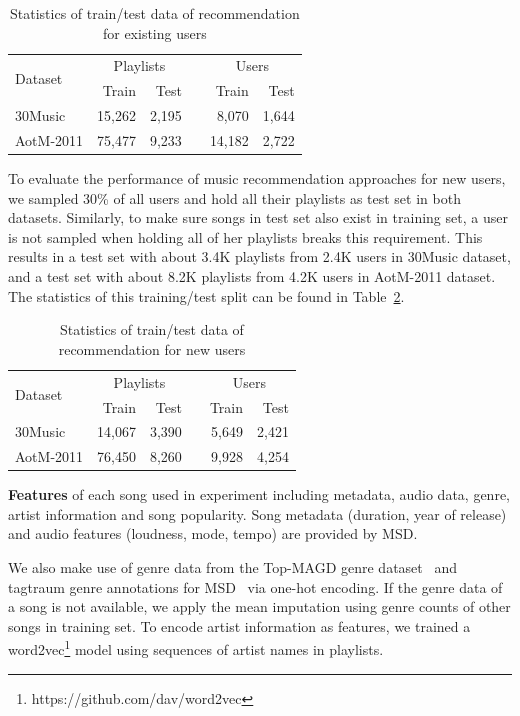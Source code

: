 \begin{table}[!h]
\centering
\caption{Statistics of train/test data of recommendation for existing users}
\label{tab:stats_warm}
\begin{tabular}{lrrcrr}
\toprule
\multirow{2}{*}{Dataset}  & \multicolumn{2}{c}{Playlists} && \multicolumn{2}{c}{Users} \\ \cmidrule{2-3} \cmidrule{5-6}
                          & Train & Test && Train & Test \\
\midrule
30Music   & 15,262 & 2,195 &&  8,070 & 1,644 \\
AotM-2011 & 75,477 & 9,233 && 14,182 & 2,722 \\
\bottomrule
\end{tabular}
\end{table}

To evaluate the performance of music recommendation approaches for new users,
we sampled 30\% of all users and hold all their playlists as test set in both datasets.
Similarly, to make sure songs in test set also exist in training set,
a user is not sampled when holding all of her playlists breaks this requirement.
This results in a test set with about 3.4K playlists from 2.4K users in 30Music dataset,
and a test set with about 8.2K playlists from 4.2K users in AotM-2011 dataset.
The statistics of this training/test split can be found in Table~\ref{tab:stats_cold}.

\begin{table}[!h]
\centering
\caption{Statistics of train/test data of recommendation for new users}
\label{tab:stats_cold}
\begin{tabular}{lrrcrr}
\toprule
\multirow{2}{*}{Dataset}  & \multicolumn{2}{c}{Playlists} && \multicolumn{2}{c}{Users} \\ \cmidrule{2-3} \cmidrule{5-6}
                          & Train & Test && Train & Test \\
\midrule
30Music   & 14,067 & 3,390 && 5,649 & 2,421 \\
AotM-2011 & 76,450 & 8,260 && 9,928 & 4,254 \\
\bottomrule
\end{tabular}
\end{table}


{\bf Features} of each song used in experiment including metadata, audio data, genre, artist information and song popularity.
Song metadata (\eg duration, year of release) and audio features (\eg loudness, mode, tempo) are provided by MSD.

We also make use of genre data from the Top-MAGD genre dataset~\cite{schindler2012facilitating}
and tagtraum genre annotations for MSD~\cite{schreiber2015improving} via one-hot encoding.
If the genre data of a song is not available, we apply the mean imputation using genre counts of other songs in training set.
To encode artist information as features,
we trained a word2vec\footnote{https://github.com/dav/word2vec} model using sequences of artist names in playlists.

